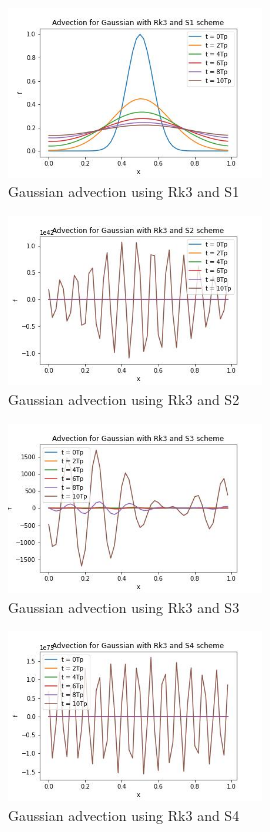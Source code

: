 \documentclass{article}
\begin{document}
	\begin{figure}[H]
		\centering
		\includegraphics[width=0.6\textwidth]{ad1.jpg}
		\caption{\label{} Gaussian advection using Rk3 and S1}
	\end{figure}
	\begin{figure}[H]
		\centering
		\includegraphics[width=0.6\textwidth]{ad2.jpg}
		\caption{\label{} Gaussian advection using Rk3 and S2}
	\end{figure}
	\begin{figure}[H]
		\centering
		\includegraphics[width=0.6\textwidth]{ad3.jpg}
		\caption{\label{} Gaussian advection using Rk3 and S3}
	\end{figure}
	\begin{figure}[H]
		\centering
		\includegraphics[width=0.6\textwidth]{ad4.jpg}
		\caption{\label{} Gaussian advection using Rk3 and S4}
	\end{figure}
\end{document}
